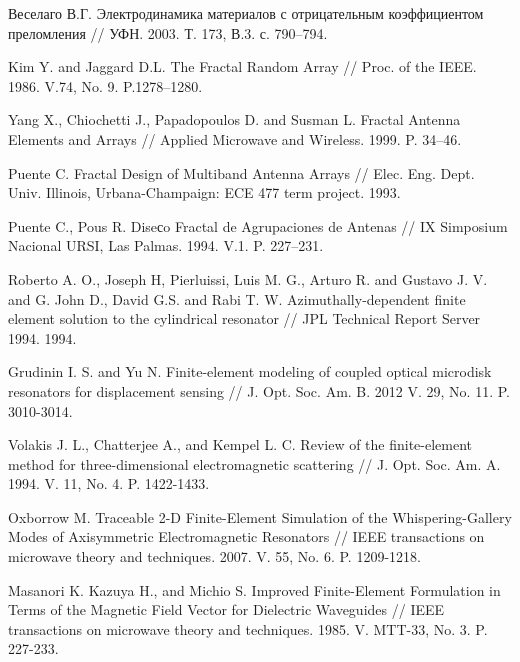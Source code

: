 \documentclass[%
specialist,  %
subf,        %
href,        %
colorlinks,  %
]{disser}
\begin{document}

\clearpage


%



\newpage
\appendix





\begin{thebibliography}{99}		
 Веселаго В.Г. Электродинамика материалов с отрицательным коэффициентом преломления // УФН. 2003. Т. 173, В.3. с. 790–794. 
	
  Kim Y. and Jaggard D.L. The Fractal Random Array // Proc. of the IEEE. 1986. V.74, No. 9. P.1278–1280.

	
 Yang X., Chiochetti J., Papadopoulos D. and Susman L. Fractal Antenna Elements and Arrays // Applied Microwave and Wireless. 1999. P. 34–46.
	
  Puente C. Fractal Design of Multiband Antenna Arrays // Elec. Eng. Dept. Univ. Illinois, Urbana-Champaign: ECE 477 term project. 1993.
	
 Puente C., Pous R. Diseсo Fractal de Agrupaciones de Antenas // IX Simposium Nacional URSI, Las Palmas. 1994. V.1. P. 227–231.
	
 Roberto A. O., Joseph H, Pierluissi, Luis M. G., Arturo R. and Gustavo J. V. and G. John D., David G.S. and Rabi T. W. Azimuthally-dependent finite element solution to the cylindrical resonator // JPL Technical Report Server 1994. 1994.
	
  Grudinin I. S.  and Yu N. Finite-element modeling of coupled optical microdisk resonators for displacement sensing // J. Opt. Soc. Am. B. 2012 V. 29, No. 11. P. 3010-3014.
	
	
 Volakis J. L., Chatterjee A., and Kempel L. C. Review of the finite-element method for three-dimensional electromagnetic scattering // J. Opt. Soc. Am. A. 1994. V. 11, No. 4. P. 1422-1433.
	
	
 Oxborrow M. Traceable 2-D Finite-Element Simulation of the Whispering-Gallery Modes of Axisymmetric Electromagnetic Resonators // IEEE transactions on microwave theory and techniques. 2007. V. 55, No. 6. P. 1209-1218.
	
	
 Masanori K. Kazuya H., and Michio S. Improved Finite-Element Formulation in Terms of the Magnetic Field Vector for Dielectric Waveguides // IEEE transactions on microwave theory and techniques. 1985. V. MTT-33, No. 3. P. 227-233.


\end{thebibliography}
\end{document}
